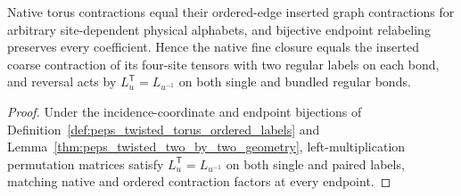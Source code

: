 \begin{lemma}%
    \label{thm:peps_twisted_torus_graph_coordinates}
    \leanok
    Native torus contractions equal their ordered-edge inserted graph
    contractions for arbitrary site-dependent physical alphabets, and bijective
    endpoint relabeling preserves every coefficient. Hence the native fine
    closure equals the inserted coarse contraction of its four-site tensors
    with two regular labels on each bond, and reversal acts by
    $L_u^{\mathsf T}=L_{u^{-1}}$ on both single and bundled regular bonds.
\end{lemma}
\begin{proof}\leanok
    Under the incidence-coordinate and endpoint bijections of
    Definition~\ref{def:peps_twisted_torus_ordered_labels} and
    Lemma~\ref{thm:peps_twisted_two_by_two_geometry}, left-multiplication
    permutation matrices satisfy $L_u^{\mathsf T}=L_{u^{-1}}$ on both single
    and paired labels, matching native and ordered contraction factors at every
    endpoint.
\end{proof}

